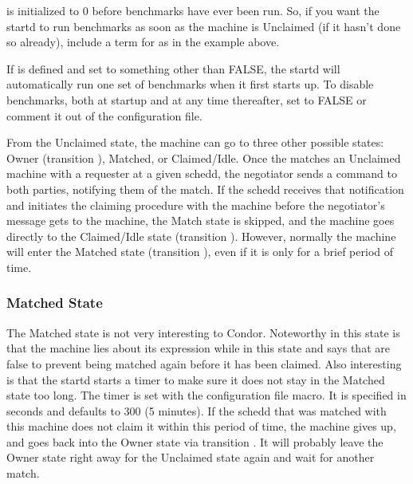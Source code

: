 \Note {} is initialized to 0 before benchmarks
have ever been run.
So, if you want the startd to run benchmarks as soon as the machine is
Unclaimed (if it hasn't done so already),
include a term for  as in the example above.

\Note If  is defined and set to something
other than FALSE, the startd will automatically run one set of
benchmarks when it first starts up.
To disable benchmarks, both at startup and at any time thereafter,
set  to FALSE or comment it out of the
configuration file.

From the Unclaimed state, the machine can go to three other possible
states: Owner (transition ), Matched, or Claimed/Idle.
Once the  matches an Unclaimed machine with a
requester at a given schedd, the negotiator sends a command to both
parties, notifying them of the match.  
If the schedd receives that notification and initiates the claiming
procedure with the machine before the negotiator's message gets to the
machine, the Match state is skipped,
and the machine goes
directly to the Claimed/Idle state (transition ).
However, normally the machine will enter the Matched state (transition
), even if it is only for a brief period of time.

\subsubsection{\label{sec:Matched-State}Matched State}

The Matched state is not very interesting to Condor.
Noteworthy in this state is that the machine lies about its 
expression while in this state and says that  are
false to prevent being matched again before it has been claimed.
Also interesting is that
the startd starts a timer to make sure it does not stay in the
Matched state too long.
The timer is set with the 
\label{param:MatchTimeout} configuration file macro.
It is specified in seconds and defaults to 300 (5 minutes).
If the schedd that was matched with this machine does not
claim it within this period of time, the machine gives up,
and goes back into the Owner state via transition .
It will probably leave the Owner state right away for the
Unclaimed state again and wait for another match. 

